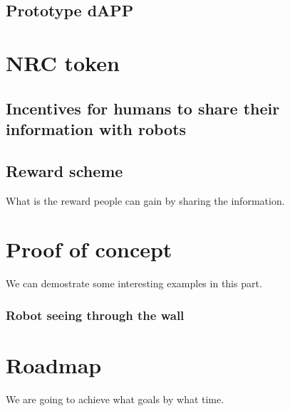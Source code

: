 \documentclass{article}
\begin{document}
\subsection{Prototype dAPP}
\label{subsec:prototype}


\section{NRC token}

\subsection{Incentives for humans to share their information 
    with robots}



\subsection{Reward scheme}
What is the reward people can gain by sharing the information.


\section{Proof of concept}
\label{sec:proof-concept}

We can demostrate some interesting examples in this part.

\subsubsection{Robot seeing through the wall}


\section{Roadmap}
\label{sec:roadmap}

We are going to achieve what goals by what time.





\small



\end{document}

